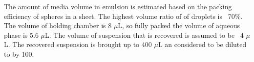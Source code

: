 The amount of media volume in emulsion is estimated based on the packing efficiency of spheres in a sheet.
The highest volume ratio of of droplets is ~70\%.
The volume of holding chamber is 8 $\mu$L, so fully packed the volume of aqueous phase is 5.6 $\mu$L.
The volume of suspension that is recovered is assumed to be ~4 $\mu$L.
The recovered suspension is brought up to 400 $\mu$L an considered to be diluted to by 100.
